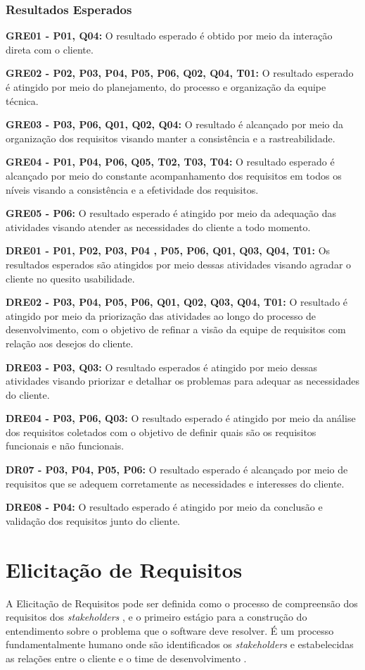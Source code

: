 	\subsection{Resultados Esperados}

\textbf{GRE01 - P01, Q04:} O resultado esperado é obtido por meio da interação direta com o cliente.

\textbf{GRE02 - P02, P03, P04, P05, P06, Q02, Q04, T01:} O resultado esperado é atingido por meio do planejamento,
 do processo e organização da equipe técnica.

\textbf{GRE03 - P03, P06, Q01, Q02, Q04:} O resultado é alcançado por meio da organização dos requisitos visando manter a
consistência e a rastreabilidade.

\textbf{GRE04 - P01, P04, P06, Q05, T02, T03, T04:} O resultado esperado é alcançado por meio do constante acompanhamento
dos requisitos em todos os níveis visando a consistência e a efetividade dos requisitos.

\textbf{GRE05 - P06:} O resultado esperado é atingido por meio da adequação das atividades visando atender as necessidades
do cliente a todo momento.

\textbf{DRE01 - P01, P02, P03, P04 , P05, P06, Q01, Q03, Q04, T01:} Os resultados esperados são atingidos por meio dessas
atividades visando agradar o cliente no quesito usabilidade.

\textbf{DRE02 - P03, P04, P05, P06, Q01, Q02, Q03, Q04, T01:} O resultado é atingido por meio da priorização das atividades
ao longo do processo de desenvolvimento, com o objetivo de refinar a visão da equipe  de requisitos com relação aos
desejos do cliente.

\textbf{DRE03 - P03, Q03:} O resultado esperados é atingido por meio dessas atividades visando priorizar e detalhar os problemas
para adequar as necessidades do cliente.

\textbf{DRE04 - P03, P06, Q03:} O resultado esperado é atingido por meio da análise dos requisitos coletados com o objetivo de
definir quais são os requisitos funcionais e não funcionais.

\textbf{DR07 - P03, P04, P05, P06:} O resultado esperado é alcançado por meio de requisitos que se adequem corretamente as
necessidades e interesses do cliente.

\textbf{DRE08 - P04:} O resultado esperado é atingido por meio da conclusão e validação dos requisitos junto do cliente.

\chapter{Elicitação de Requisitos}
A Elicitação de Requisitos pode ser definida como o processo de compreensão dos requisitos dos \textit{stakeholders}
\cite{yousuf2015}, e o primeiro estágio para a construção do entendimento sobre o problema que o software deve resolver.
É um processo fundamentalmente humano onde são identificados os \textit{stakeholders} e estabelecidas as relações entre o cliente e o
 time de desenvolvimento \cite{swebok2004}.

